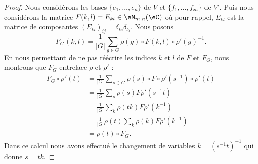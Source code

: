 \begin{proof}
	Nous considérons les bases \( \{ e_1,\ldots, e_n \} \) de \( V\) et \( \{ f_1,\ldots, f_m \}\) de \( V'\). Puis nous considérons la matrice \( F(k,l)=E_{kl}\in\eM_{m,n}(\eC)\) où pour rappel, \( E_{kl}\) est la matrice de composantes \( (E_{kl})_{ij}=\delta_{ki}\delta_{lj}\). Nous posons
	\begin{equation}
		F_G(k,l)=\frac{1}{ | G | }\sum_{g\in G}\rho(g)\circ F(k,l)\circ\rho'(g)^{-1}.
	\end{equation}
	En nous permettant de ne pas réécrire les indices \( k\) et \(l \) de \( F\) et \( F_G\), nous montrons que \( F_G\) entrelace \( \rho\) et \( \rho'\) :
	\begin{subequations}
		\begin{align}
			F_G\circ\rho'(t) & =\frac{1}{ | G | }\sum_{s\in G}\rho(s)\circ F\circ \rho'(s^{-1})\circ \rho'(t) \\
			                 & =\frac{1}{ | G | }\sum_s\rho(s)F\rho'(s^{-1} t)                                \\
			                 & =\frac{1}{ | G | }\sum_{k}\rho(tk)F\rho'(k^{-1})                               \\
			                 & =\frac{1}{ | G | }\rho(t) \sum_k\rho(k)F\rho'(k^{-1})                          \\
			                 & =\rho(t)\circ F_G.
		\end{align}
	\end{subequations}
	Dans ce calcul nous avons effectué le changement de variables \( k=(s^{-1} t)^{-1}\) qui donne \( s=tk\).


\end{proof}
